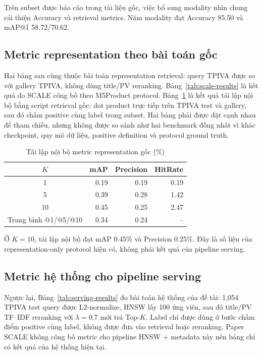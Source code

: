 \documentclass[10pt,conference]{IEEEtran}
\begin{document}
Trên subset được báo cáo trong tài liệu gốc, việc bổ sung modality nhìn chung cải thiện Accuracy và retrieval metrics. Năm modality đạt Accuracy 85.50 và mAP@1 58.72/70.62.

\subsection{Metric representation theo bài toán gốc}

Hai bảng sau cùng thuộc bài toán representation retrieval: query TPIVA được so với gallery TPIVA, không dùng title/PV reranking. Bảng~\ref{tab:scale-results} là kết quả do SCALE công bố theo M5Product protocol. Bảng~\ref{tab:local-results} là kết quả tái lập nội bộ bằng script retrieval gốc: dot product trực tiếp trên TPIVA test và gallery, sau đó chấm positive cùng label trong subset. Hai bảng phải được đặt cạnh nhau để tham chiếu, nhưng không được so sánh như hai benchmark đồng nhất vì khác checkpoint, quy mô dữ liệu, positive definition và protocol ground truth.

\begin{table}[t]
\centering
\caption{Tái lập nội bộ metric representation gốc (\%)}
\label{tab:local-results}
\small
\begin{tabular}{crrr}
\toprule
$K$ & mAP & Precision & HitRate\\
\midrule
1  & 0.19 & 0.19 & 0.19\\
5  & 0.39 & 0.28 & 1.42\\
10 & 0.45 & 0.25 & 2.47\\
\midrule
Trung bình @1/@5/@10 & 0.34 & 0.24 & --\\
\bottomrule
\end{tabular}
\end{table}

Ở $K=10$, tái lập nội bộ đạt mAP 0.45\% và Precision 0.25\%. Đây là số liệu của representation-only protocol hiện có, không phải kết quả của pipeline serving.

\subsection{Metric hệ thống cho pipeline serving}

Ngược lại, Bảng~\ref{tab:serving-results} đo bài toán hệ thống của đề tài: 1,054 TPIVA test query được L2-normalize, HNSW lấy 100 ứng viên, sau đó title/PV TF--IDF reranking với $\lambda=0.7$ mới trả Top-$K$. Label chỉ được dùng ở bước chấm điểm positive cùng label, không được đưa vào retrieval hoặc reranking. Paper SCALE không công bố metric cho pipeline HNSW + metadata này nên bảng chỉ có kết quả của hệ thống hiện tại.
\end{document}
